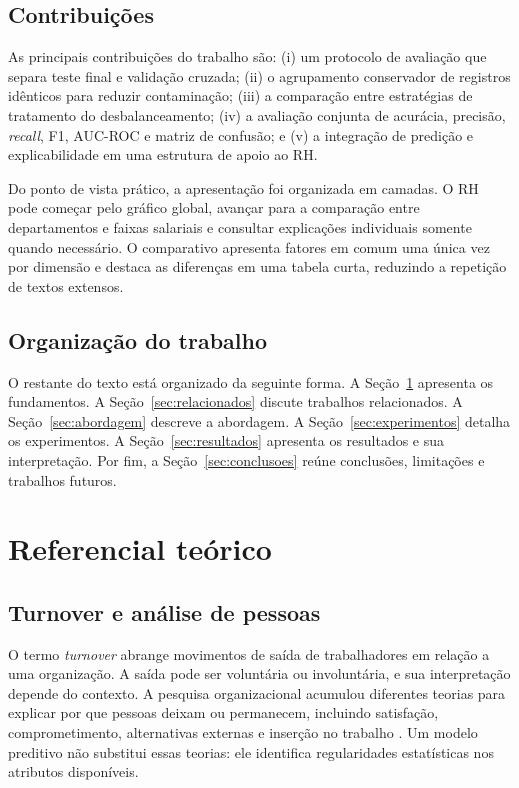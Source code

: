 \documentclass[12pt]{article}
\begin{document}
\subsection{Contribuições}

As principais contribuições do trabalho são: (i) um protocolo de avaliação que separa teste final e validação cruzada; (ii) o agrupamento conservador de registros idênticos para reduzir contaminação; (iii) a comparação entre estratégias de tratamento do desbalanceamento; (iv) a avaliação conjunta de acurácia, precisão, \textit{recall}, F1, AUC-ROC e matriz de confusão; e (v) a integração de predição e explicabilidade em uma estrutura de apoio ao RH.

Do ponto de vista prático, a apresentação foi organizada em camadas. O RH pode começar pelo gráfico global, avançar para a comparação entre departamentos e faixas salariais e consultar explicações individuais somente quando necessário. O comparativo apresenta fatores em comum uma única vez por dimensão e destaca as diferenças em uma tabela curta, reduzindo a repetição de textos extensos.

\subsection{Organização do trabalho}

O restante do texto está organizado da seguinte forma. A Seção~\ref{sec:referencial} apresenta os fundamentos. A Seção~\ref{sec:relacionados} discute trabalhos relacionados. A Seção~\ref{sec:abordagem} descreve a abordagem. A Seção~\ref{sec:experimentos} detalha os experimentos. A Seção~\ref{sec:resultados} apresenta os resultados e sua interpretação. Por fim, a Seção~\ref{sec:conclusoes} reúne conclusões, limitações e trabalhos futuros.

\section{Referencial teórico}
\label{sec:referencial}

\subsection{Turnover e análise de pessoas}

O termo \textit{turnover} abrange movimentos de saída de trabalhadores em relação a uma organização. A saída pode ser voluntária ou involuntária, e sua interpretação depende do contexto. A pesquisa organizacional acumulou diferentes teorias para explicar por que pessoas deixam ou permanecem, incluindo satisfação, comprometimento, alternativas externas e inserção no trabalho \cite{hom2017turnover}. Um modelo preditivo não substitui essas teorias: ele identifica regularidades estatísticas nos atributos disponíveis.
\end{document}

